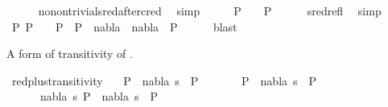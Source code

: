 \begin{isabellebody}
\ \ \ \ \isamarkupfalse%
\ no{\isacharunderscore}{\kern0pt}nontrivial{\isacharunderscore}{\kern0pt}sred{\isacharunderscore}{\kern0pt}after{\isacharunderscore}{\kern0pt}cred\ \isamarkupfalse%
\ simp\isanewline
\ \ \isamarkupfalse%
\ \isamarkupfalse%
\ {\isachardoublequoteopen}P{}\ {\isasymturnstile}\ {\isacharbrackleft}{\kern0pt}{\isacharbrackright}{\kern0pt}\ {\isasymleadsto}\isactrlsup {\isacharasterisk}{\kern0pt}\ P{}{\isachardoublequoteclose}\isanewline
\ \ \ \ \isamarkupfalse%
\ sred{\isacharunderscore}{\kern0pt}refl\ \isamarkupfalse%
\ simp\isanewline
\ \ \isamarkupfalse%
\ \isamarkupfalse%
\ {\isachardoublequoteopen}{\isasymexists}P{}{\isachardot}{\kern0pt}\ P{}\ {\isasymturnstile}\ {\isacharbrackleft}{\kern0pt}{\isacharbrackright}{\kern0pt}\ {\isasymleadsto}\isactrlsup {\isacharasterisk}{\kern0pt}\ P{}\ {\isasymand}\ P{}\ {\isasymturnstile}\ {\isacharparenleft}{\kern0pt}nabla{}\ {\isasymunion}\ nabla{}{\isacharparenright}{\kern0pt}\ {\isasymrightarrow}\isactrlsup {\isacharasterisk}{\kern0pt}\ P{}{\isachardoublequoteclose}\isanewline
\ \ \ \ \isamarkupfalse%
\ blast\isanewline
{}\isamarkupfalse%
%
\endisatagproof
{\isafoldproof}%
%
\isadelimproof
%
\endisadelimproof
%
\begin{isamarkuptext}%
A form of transitivity of .%
\end{isamarkuptext}\isamarkuptrue%
\isamarkupfalse%
\ red{\isacharunderscore}{\kern0pt}plus{\isacharunderscore}{\kern0pt}transitivity{\isacharcolon}{\kern0pt}\isanewline
\ \ \ {\isachardoublequoteopen}P{}\ {\isasymTurnstile}\ {\isacharparenleft}{\kern0pt}nabla{}{\isacharcomma}{\kern0pt}\ s{}{\isacharparenright}{\kern0pt}\ {\isasymRightarrow}\ P{}{\isachardoublequoteclose}\isanewline
\ \ \ \ \ \ \ {\isachardoublequoteopen}P{}\ {\isasymTurnstile}\ {\isacharparenleft}{\kern0pt}nabla{}{\isacharcomma}{\kern0pt}\ s{}{\isacharparenright}{\kern0pt}\ {\isasymRightarrow}\ P{}{\isachardoublequoteclose}\isanewline
\ \ \ \ \ {\isachardoublequoteopen}{\isasymexists}\ nabla{}\ s{}{\isachardot}{\kern0pt}\ P{}\ {\isasymTurnstile}\ {\isacharparenleft}{\kern0pt}nabla{}{\isacharcomma}{\kern0pt}\ s{}{\isacharparenright}{\kern0pt}\ {\isasymRightarrow}\ P{}{\isachardoublequoteclose}\isanewline

\end{isabellebody}
